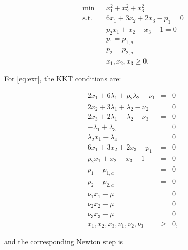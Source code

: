 \documentclass[letter, 11pt]{article}
\begin{document}
\begin{subequations}\label{eq:exr}
\begin{eqnarray}
  \min&& x_1^2+x_2^2+x_3^2\\
  \mathrm{s.t.}&&6x_1+3x_2+2x_3-p_1 = 0\\
  &&p_2x_1+x_2-x_3-1 = 0\\
  &&p_1 = p_{1,a}\\
  &&p_2 = p_{2,a}\\
  &&x_1,x_2,x_3\geq 0.
\end{eqnarray}
\end{subequations}

For \eqref{eq:exr}, the KKT conditions are:

\begin{eqnarray}   \label{eq:exr:kkt}
  2x_1+6\lambda_1+p_2\lambda_2-\nu_1 &=& 0\\
  2x_2+3\lambda_1+\lambda_2-\nu_2&=& 0\\
  2x_3+2\lambda_1-\lambda_2-\nu_3 &=&0\\
  -\lambda_1+\lambda_3&=&0\\
  \lambda_2x_1+\lambda_4&=&0\\
  6x_1+3x_2+2x_3-p_1 &=&0\\
  p_2x_1+x_2-x_3-1 &=&0\\
  p_1-p_{1,a}&=&0\\
  p_2-p_{2,a}&=&0\\
  \nu_1x_1-\mu &=& 0\\
  \nu_2x_2-\mu&=& 0\\
  \nu_3x_3-\mu&=& 0\\
  x_1,x_2,x_3,\nu_1,\nu_2,\nu_3&\geq& 0,
\end{eqnarray}

\noindent and the corresponding Newton step is
\end{document}

